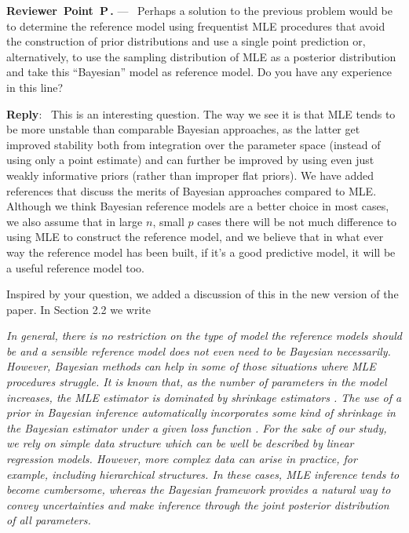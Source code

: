 \documentclass[11pt]{article}
\newcounter{reviewer}
\newcounter{point}[reviewer]
\renewcommand{\thepoint}{P\,\thereviewer.\arabic{point}}
\newenvironment{point}
   {\refstepcounter{point} \bigskip \noindent \begin{sf}{\textbf{Reviewer~Point~\thepoint} } ---\ }
   {\par \end{sf}}
\newenvironment{reply}
   {\medskip \noindent \textbf{Reply}:\  }
   {\medskip}
\newcommand{\todo}{\subsection*{\textcolor{red}{To do (comment out when done)}:}}
\begin{document}

\begin{point}
Perhaps a solution to the previous problem would be to determine the reference model using frequentist MLE procedures that avoid the construction of prior distributions and use a single point prediction or, alternatively, to use the sampling distribution of MLE as a posterior distribution and take this “Bayesian” model as reference model. Do you have any experience in this line?
\end{point}

\begin{reply}
This is an interesting question. The way we see it is that MLE tends to be more unstable than comparable Bayesian approaches, as the latter get improved stability both from integration over the parameter space (instead of using only a point estimate) and can further be improved by using even just weakly informative priors (rather than improper flat priors). We have added references that discuss the merits of Bayesian approaches compared to MLE. Although we think Bayesian reference models are a better choice in most cases, we also assume that in large $n$, small $p$ cases there will be not much difference to using MLE to construct the reference model, and we believe that in what ever way the reference model has been built, if it's a good predictive model, it will be a useful reference model too.

Inspired by your question, we added a discussion of this in the new version of the paper. In Section 2.2 we write

\vspace{0.5\baselineskip}
\textit{In general, there is no restriction on the type of model the reference models should be and a sensible reference model does not even need to be Bayesian necessarily.
	However, Bayesian methods can help in some of those situations
	where MLE procedures struggle. 
	It is known that, as the number of parameters in the model increases, the MLE
	estimator is dominated by shrinkage estimators 
	\citep{stein1956inadmissibility, stein1961estimation, parmigiani2009decision, efron2011tweedie}.
	The use of a prior in Bayesian inference automatically incorporates 
	some kind of shrinkage in the Bayesian estimator under a given loss function \citep[see, e.g.][]{rockova2012hierarchical}. 
	For the sake of our study, we rely on simple data structure which can be well be described 
	by linear regression models. However, more complex data can arise in practice, for example, including hierarchical structures. In these cases, MLE inference tends to become cumbersome, whereas the Bayesian framework provides a natural way to convey uncertainties and make inference through the joint posterior distribution of all parameters.}

\vspace{0.5\baselineskip}

\end{reply}
\end{document}
